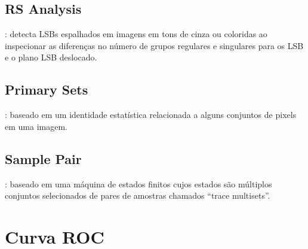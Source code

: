 \subsection{RS Analysis}
\cite{fridrich2001reliable}: detecta LSBs espalhados em imagens em tons de cinza ou coloridas ao inspecionar as diferenças no número de grupos regulares e singulares para os LSB e o plano LSB deslocado.

\subsection{Primary Sets}
\cite{dumitrescu2002steganalysis}: baseado em um identidade estatística relacionada a alguns conjuntos de pixels em uma imagem.

\subsection{Sample Pair}
\cite{dumitrescu2003detection}: baseado em uma máquina de estados finitos cujos estados são múltiplos conjuntos selecionados de pares de amostras chamados ``trace multisets''.


\section{Curva ROC}


